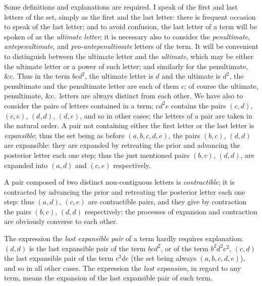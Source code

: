 \documentclass[11pt,a4paper]{book}
\begin{document}
Some definitions and explanations are required. I speak of the first and last letters of the set, simply as the first and the last letter: there is frequent occasion to speak of the last letter; and to avoid confusion, the last letter of a term will be spoken of as the \textit{ultimate letter}; it is necessary also to consider the \textit{penultimate}, \textit{antepenultimate}, and \textit{pro-antepenultimate} letters of the term. It will be convenient to distinguish between the ultimate letter and the \textit{ultimate}, which may be either the ultimate letter or a power of such letter; and similarly for the penultimate, \&c. Thus in the term $bcd^2$, the ultimate letter is $d$ and the ultimate is $d^2$, the penultimate and the penultimate letter are each of them $c$; of course the ultimate, penultimate, \&c.\ letters are always distinct from each other. We have also to consider the pairs of letters contained in a term; $cd^2e$ contains the pairs $(c,d)$, $(c,e)$, $(d,d)$, $(d,e)$, and so in other cases; the letters of a pair are taken in the natural order. A pair not containing either the first letter or the last letter is \textit{expansible}; thus the set being as before $(a,b,c,d,e)$, the pairs $(b,c)$, $(d,d)$ are expansible: they are expanded by retreating the prior and advancing the posterior letter each one step; thus the just mentioned pairs $(b,c)$, $(d,d)$, are expanded into $(a,d)$ and $(c,e)$ respectively.

A pair composed of two distinct non-contiguous letters is \textit{contractible}; it is contracted by advancing the prior and retreating the posterior letter each one step: thus $(a,d)$, $(c,e)$ are contractible pairs, and they give by contraction the pairs $(b,c)$, $(d,d)$ respectively: the processes of expansion and contraction are obviously converse to each other.

The expression the \textit{last expansible pair} of a term hardly requires explanation; $(d,d)$ is the last expansible pair of the term $bcd^2$, or of the term $b^2d^2e^2$, $(c,d)$ the last expansible pair of the term $c^3de$ (the set being always $(a,b,c,d,e)$), and so in all other cases. The expression the \textit{last expansion}, in regard to any term, means the expansion of the last expansible pair of such term.
\end{document}
